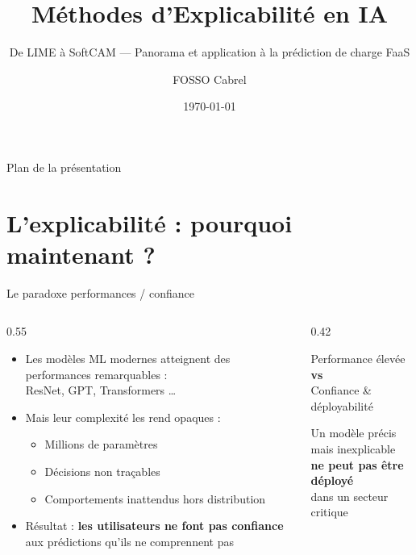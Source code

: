 \documentclass[10pt]{beamer}
\title{Méthodes d'Explicabilité en IA}
\subtitle{De LIME à SoftCAM --- Panorama et application à la prédiction de charge FaaS}
\author{FOSSO Cabrel}
\institute{Université de Dschang}
\date{\today}
\begin{document}

\frame{\titlepage}

\begin{frame}{Plan de la présentation}
  \tableofcontents[hideallsubsections]
\end{frame}


\section{L'explicabilité : pourquoi maintenant ?}

\begin{frame}{Le paradoxe performances / confiance}
  \begin{columns}
    \begin{column}{0.55\textwidth}
      \begin{itemize}
        \item Les modèles ML modernes atteignent des performances remarquables :\\
              ResNet, GPT, Transformers \ldots
        \item Mais leur complexité les rend \alert{opaques} :
              \begin{itemize}
                \item Millions de paramètres
                \item Décisions non traçables
                \item Comportements inattendus hors distribution
              \end{itemize}
        \item Résultat : \textbf{les utilisateurs ne font pas confiance} aux prédictions
              qu'ils ne comprennent pas
      \end{itemize}
    \end{column}
    \begin{column}{0.42\textwidth}
    	\begin{dilemmabox}
    		Performance élevée\\[4pt]
    		\textbf{vs}\\[4pt]
    		Confiance \& déployabilité
    	\end{dilemmabox}
    	
    	\vspace{6pt}
    	
    	\begin{constatbox}
    		Un modèle précis mais inexplicable\\
    		\textbf{ne peut pas être déployé}\\
    		dans un secteur critique
    	\end{constatbox}
    \end{column}
  \end{columns}
\end{frame}
\end{document}
